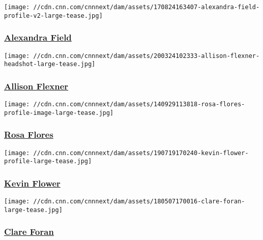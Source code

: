 \href{/profiles/alexandra-field-profile}{}

\texttt{[image: //cdn.cnn.com/cnnnext/dam/assets/170824163407-alexandra-field-profile-v2-large-tease.jpg]}

\hypertarget{alexandra-field}{%
\subsubsection{\texorpdfstring{\href{/profiles/alexandra-field-profile}{Alexandra
Field}}{Alexandra Field}}\label{alexandra-field}}

\href{/profiles/allison-flexner-profile}{}

\texttt{[image: //cdn.cnn.com/cnnnext/dam/assets/200324102333-allison-flexner-headshot-large-tease.jpg]}

\hypertarget{allison-flexner}{%
\subsubsection{\texorpdfstring{\href{/profiles/allison-flexner-profile}{Allison
Flexner}}{Allison Flexner}}\label{allison-flexner}}

\href{/profiles/rosa-flores-profile}{}

\texttt{[image: //cdn.cnn.com/cnnnext/dam/assets/140929113818-rosa-flores-profile-image-large-tease.jpg]}

\hypertarget{rosa-flores}{%
\subsubsection{\texorpdfstring{\href{/profiles/rosa-flores-profile}{Rosa
Flores}}{Rosa Flores}}\label{rosa-flores}}

\href{/profiles/kevin-flower-profile}{}

\texttt{[image: //cdn.cnn.com/cnnnext/dam/assets/190719170240-kevin-flower-profile-large-tease.jpg]}

\hypertarget{kevin-flower}{%
\subsubsection{\texorpdfstring{\href{/profiles/kevin-flower-profile}{Kevin
Flower}}{Kevin Flower}}\label{kevin-flower}}

\href{/profiles/clare-foran}{}

\texttt{[image: //cdn.cnn.com/cnnnext/dam/assets/180507170016-clare-foran-large-tease.jpg]}

\hypertarget{clare-foran}{%
\subsubsection{\texorpdfstring{\href{/profiles/clare-foran}{Clare
Foran}}{Clare Foran}}\label{clare-foran}}

